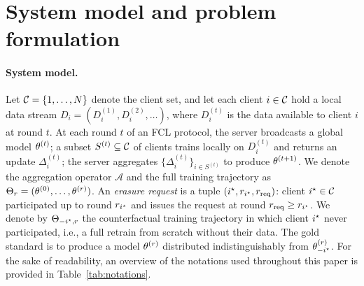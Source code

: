\section{System model and problem formulation}
\label{sec:prelim}

\paragraph{System model.}
Let $\mathcal{C} = \{1, \dots, N\}$ denote the client set, and let each client $i \in
\mathcal{C}$ hold a local data stream $D_i = (D_i^{(1)}, D_i^{(2)}, \dots)$, where
$D_i^{(t)}$ is the data available to client $i$ at round $t$. At each round $t$ of an
FCL protocol, the server broadcasts a global model $\theta^{(t)}$; a subset $S^{(t)}
\subseteq \mathcal{C}$ of clients trains locally on $D_i^{(t)}$ and returns an update
$\Delta_i^{(t)}$; the server aggregates $\{\Delta_i^{(t)}\}_{i \in S^{(t)}}$ to produce
$\theta^{(t+1)}$. We denote the aggregation operator $\mathcal{A}$ and the full training
trajectory as $\Theta_{r} = (\theta^{(0)}, \dots, \theta^{(r)})$. An \emph{erasure
request} is a tuple $(i^{\star}, r_{i^{\star}}, r_{\mathrm{req}})$: client $i^{\star} \in
\mathcal{C}$ participated up to round $r_{i^{\star}}$ and issues the request at round
$r_{\mathrm{req}} \geq r_{i^{\star}}$. We denote by $\Theta_{-i^{\star}, r}$ the
counterfactual training trajectory in which client $i^{\star}$ never participated, i.e., a
full retrain from scratch without their data. The gold standard is to produce a model
$\theta^{(r)}$ distributed indistinguishably from $\theta_{-i^{\star}}^{(r)}$. For the
sake of readability, an overview of the notations used throughout this paper is provided
in Table~\ref{tab:notations}.

